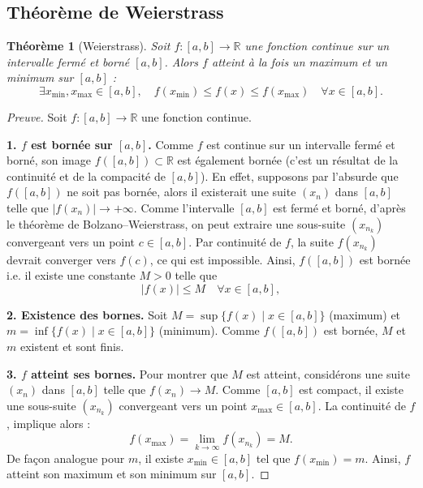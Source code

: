\documentclass{report} %
\theoremstyle{definition}  %
\theoremstyle{plain} %
\newtheorem{theorem}{Théorème}[chapter]
\theoremstyle{remark} %
\begin{document}
\medskip

\subsection{\textbf{Théorème de Weierstrass}}

\begin{theorem}[Weierstrass]
Soit \(f : [a,b] \to \mathbb{R}\) une fonction continue sur un intervalle fermé et borné \([a,b]\).  
Alors \(f\) atteint à la fois un maximum et un minimum sur \([a,b]\) :
\[
\exists x_{\min}, x_{\max} \in [a,b], \quad f(x_{\min}) \le f(x) \le f(x_{\max}) \quad \forall x \in [a,b].
\]
\end{theorem}

\medskip

\begin{proof}[Preuve]
Soit \(f : [a,b] \to \mathbb{R}\) une fonction continue.

\medskip
\noindent
\textbf{1. \(f\) est bornée sur \([a,b]\).}  
Comme \(f\) est continue sur un intervalle fermé et borné,
son image \(f([a,b]) \subset \mathbb{R}\) est également bornée
(c’est un résultat de la continuité et de la compacité de \([a,b]\)).
En effet, supposons par l'absurde que \(f([a,b])\) ne soit pas bornée, alors il existerait une suite
\((x_n)\) dans \([a,b]\) telle que \(|f(x_n)| \to +\infty\).
Comme l'intervalle \([a,b]\) est fermé et borné, d’après le théorème de Bolzano--Weierstrass, 
on peut extraire une sous-suite
\((x_{n_k})\) convergeant vers un point \(c \in [a,b]\).
Par continuité de \(f\), la suite \(f(x_{n_k})\) devrait converger vers
\(f(c)\), ce qui est impossible.
Ainsi, \(f([a,b])\) est bornée i.e. il existe une constante \(M > 0\) telle que
\[
|f(x)| \le M \quad \forall x \in [a,b],
\]

\medskip
\noindent
\textbf{2. Existence des bornes.}  
Soit \(M = \sup\{f(x) \mid x \in [a,b]\}\) (maximum) et \(m = \inf\{f(x) \mid x \in [a,b]\}\) (minimum).  
   Comme \(f([a,b])\) est bornée, \(M\) et \(m\) existent et sont finis.

\medskip
\noindent
\textbf{3. \(f\) atteint ses bornes.}  
Pour montrer que \(M\) est atteint, considérons une suite \((x_n)\) dans \([a,b]\) telle que \(f(x_n) \to M\).  
   Comme \([a,b]\) est compact, il existe une sous-suite \((x_{n_k})\) convergeant vers un point \(x_{\max} \in [a,b]\).
   La continuité de \(f\), implique alors :
\[
f(x_{\max}) = \lim_{k \to \infty} f(x_{n_k}) = M.
\]
\noindent
De façon analogue pour \(m\), il existe \(x_{\min} \in [a,b]\) tel que \(f(x_{\min}) = m\).
\noindent
Ainsi, \(f\) atteint son maximum et son minimum sur \([a,b]\).

\medskip
\end{proof}
\end{document}

